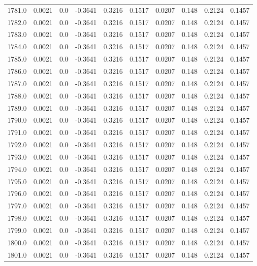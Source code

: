 \begin{longtable}{lrrrrrrrrr}
1781.0 & 0.0021 & 0.0 & -0.3641 & 0.3216 & 0.1517 & 0.0207 & 0.148 & 0.2124 & 0.1457 \\
1782.0 & 0.0021 & 0.0 & -0.3641 & 0.3216 & 0.1517 & 0.0207 & 0.148 & 0.2124 & 0.1457 \\
1783.0 & 0.0021 & 0.0 & -0.3641 & 0.3216 & 0.1517 & 0.0207 & 0.148 & 0.2124 & 0.1457 \\
1784.0 & 0.0021 & 0.0 & -0.3641 & 0.3216 & 0.1517 & 0.0207 & 0.148 & 0.2124 & 0.1457 \\
1785.0 & 0.0021 & 0.0 & -0.3641 & 0.3216 & 0.1517 & 0.0207 & 0.148 & 0.2124 & 0.1457 \\
1786.0 & 0.0021 & 0.0 & -0.3641 & 0.3216 & 0.1517 & 0.0207 & 0.148 & 0.2124 & 0.1457 \\
1787.0 & 0.0021 & 0.0 & -0.3641 & 0.3216 & 0.1517 & 0.0207 & 0.148 & 0.2124 & 0.1457 \\
1788.0 & 0.0021 & 0.0 & -0.3641 & 0.3216 & 0.1517 & 0.0207 & 0.148 & 0.2124 & 0.1457 \\
1789.0 & 0.0021 & 0.0 & -0.3641 & 0.3216 & 0.1517 & 0.0207 & 0.148 & 0.2124 & 0.1457 \\
1790.0 & 0.0021 & 0.0 & -0.3641 & 0.3216 & 0.1517 & 0.0207 & 0.148 & 0.2124 & 0.1457 \\
1791.0 & 0.0021 & 0.0 & -0.3641 & 0.3216 & 0.1517 & 0.0207 & 0.148 & 0.2124 & 0.1457 \\
1792.0 & 0.0021 & 0.0 & -0.3641 & 0.3216 & 0.1517 & 0.0207 & 0.148 & 0.2124 & 0.1457 \\
1793.0 & 0.0021 & 0.0 & -0.3641 & 0.3216 & 0.1517 & 0.0207 & 0.148 & 0.2124 & 0.1457 \\
1794.0 & 0.0021 & 0.0 & -0.3641 & 0.3216 & 0.1517 & 0.0207 & 0.148 & 0.2124 & 0.1457 \\
1795.0 & 0.0021 & 0.0 & -0.3641 & 0.3216 & 0.1517 & 0.0207 & 0.148 & 0.2124 & 0.1457 \\
1796.0 & 0.0021 & 0.0 & -0.3641 & 0.3216 & 0.1517 & 0.0207 & 0.148 & 0.2124 & 0.1457 \\
1797.0 & 0.0021 & 0.0 & -0.3641 & 0.3216 & 0.1517 & 0.0207 & 0.148 & 0.2124 & 0.1457 \\
1798.0 & 0.0021 & 0.0 & -0.3641 & 0.3216 & 0.1517 & 0.0207 & 0.148 & 0.2124 & 0.1457 \\
1799.0 & 0.0021 & 0.0 & -0.3641 & 0.3216 & 0.1517 & 0.0207 & 0.148 & 0.2124 & 0.1457 \\
1800.0 & 0.0021 & 0.0 & -0.3641 & 0.3216 & 0.1517 & 0.0207 & 0.148 & 0.2124 & 0.1457 \\
1801.0 & 0.0021 & 0.0 & -0.3641 & 0.3216 & 0.1517 & 0.0207 & 0.148 & 0.2124 & 0.1457 \\

\end{longtable}
